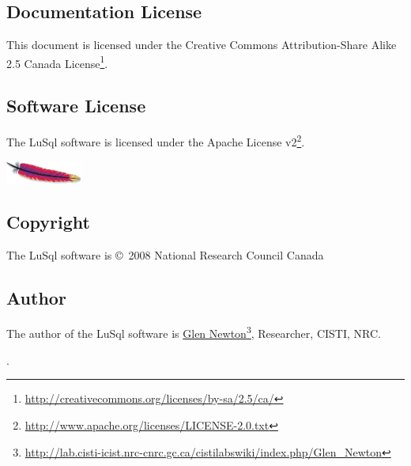 
\subsection{Documentation License}
This document is licensed under the
Creative Commons Attribution-Share Alike 2.5 Canada 
License\footnote{\url{http://creativecommons.org/licenses/by-sa/2.5/ca/}}.


\subsection{Software License}
The LuSql software is licensed under the 
Apache License v2\footnote{\url{http://www.apache.org/licenses/LICENSE-2.0.txt}}.

\begin{center}
  \includegraphics[width=2.5cm]{images/apache-feather-small.png}
\end{center}

\subsection{Copyright}
The LuSql software is \copyright \ 2008  National Research Council Canada


\subsection{Author}
The author of the LuSql software is
\href{http://lab.cisti-icist.nrc-cnrc.gc.ca/cistilabswiki/index.php/Glen_Newton}{Glen
  Newton}\footnote{\url{http://lab.cisti-icist.nrc-cnrc.gc.ca/cistilabswiki/index.php/Glen_Newton}}, Researcher, CISTI, NRC.

.



